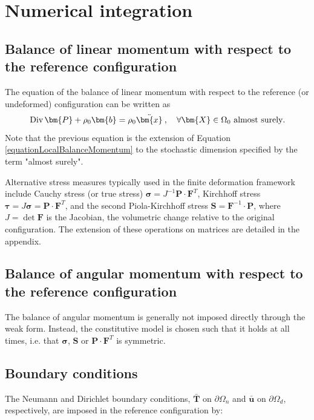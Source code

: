 \documentclass[oneside,11pt,times]{book}
\begin{document}
\section{Numerical integration}
\subsection{Balance of linear momentum with respect to the reference configuration}
 \label{subsectionBalanceMomentum}

The equation of the balance of linear momentum with respect to the reference (or undeformed) configuration can be written as
%
\begin{equation} \label{equationLocalBalanceMomentumStochastic}
 \text{Div} \, \bm{P} + \rho_0  \bm{b} = \rho_0 \ddot{\bm{x}} \: , \quad \forall \bm{X} \in \Omega_0 \ \textnormal{almost surely}.
\end{equation}
%
Note that the previous equation is the extension of Equation \ref{equationLocalBalanceMomentum} to the stochastic dimension specified by the term "almost surely".

Alternative stress measures typically used in the finite deformation framework include Cauchy stress (or true stress) $\bm{\sigma} = J^{-1} \bm{P} \cdot \bm{F}^{T}$, Kirchhoff stress $\bm{\tau} = J \bm{\sigma} = \bm{P} \cdot \bm{F}^{T}$, and the second Piola-Kirchhoff stress $\bm{S} = \bm{F}^{-1} \cdot \bm{P}$, where $J = \det \bm{F}$ is the Jacobian, the volumetric change relative to the original configuration. The extension of these operations on matrices are detailed in the appendix.

\subsection{Balance of angular momentum with respect to the reference configuration}

The balance of angular momentum is generally not imposed directly through the weak form. Instead, the constitutive model is chosen such that it holds at all times, i.e. that $\bm{\sigma}$, $\bm{S}$ or $\bm{P}\cdot \bm{F}^{T}$ is symmetric.


\subsection{Boundary conditions}

The Neumann and Dirichlet boundary conditions, $\bar{\bm{T}}$ on $\partial \Omega_n$ and $\bar{\bm{u}}$ on $\partial \Omega_d$, respectively, are imposed in the reference configuration by:
\end{document}
